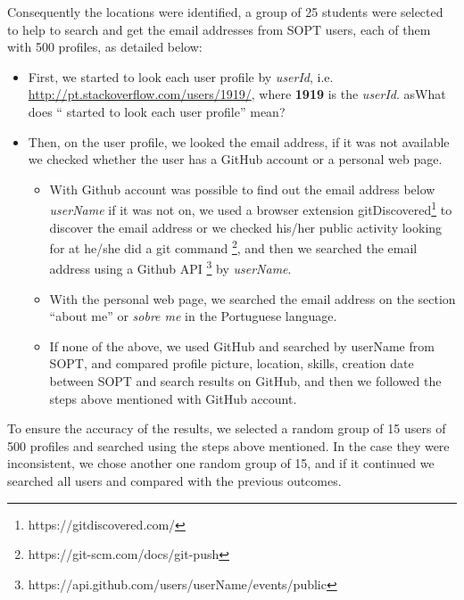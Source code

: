 Consequently the locations were identified, a group of 25 students  were selected to help to search and get the email addresses from SOPT users, each of them with 500 profiles, as detailed below:
\begin{itemize}
    \item First, we started to look each user profile by \textit{userId}, i.e. \url{http://pt.stackoverflow.com/users/1919/}, where \textbf{1919} is the \textit{userId}. as{What does `` started to look each user profile'' mean?}
    \item Then, on the user profile, we looked the email address, if it was not available we checked whether the user has a GitHub account or a personal web page. 
        \begin{itemize}
            \item With Github account was possible to find out the email address below \textit{userName} if it was not on, we used a browser extension gitDiscovered\footnote{https://gitdiscovered.com/} to discover the email address or we checked his/her public activity looking for at he/she did a git command \footnote{https://git-scm.com/docs/git-push}, and then we searched the email address using a Github API \footnote{https://api.github.com/users/userName/events/public} by \textit{userName}. 
            \item With the personal web page, we searched the email address on the section ``about me'' or \textit{sobre me} in the Portuguese language.
            \item If none of the above, we used GitHub and searched by userName from SOPT, and compared profile picture, location, skills, creation date between SOPT and search results on GitHub, and then we followed the steps above mentioned with GitHub account.              
       \end{itemize}            
   \end{itemize} 
To ensure the accuracy of the results, we selected a random group of 15 users of 500 profiles and searched using the steps above mentioned. In the case they were inconsistent, we chose another one random group of 15, and if it continued we searched all users and compared with the previous outcomes.


